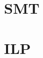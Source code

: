 \documentclass[a4paper, 11pt]{article}
\begin{document}
\section{SMT}\label{chapter:SMT}

\newpage


\section{ILP}\label{chapter:ILP}

\newpage

% 
% 
\nocite{*}
\printbibliography

\end{document}
